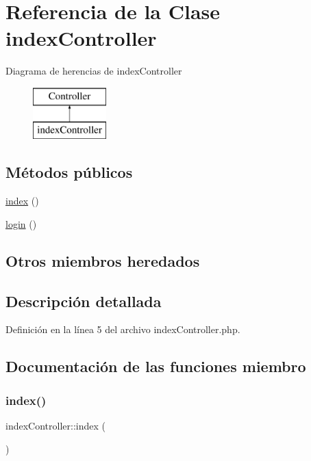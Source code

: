 \hypertarget{classindex_controller}{}\section{Referencia de la Clase index\+Controller}
\label{classindex_controller}
Diagrama de herencias de index\+Controller\begin{figure}[H]
\begin{center}
\leavevmode
\includegraphics[height=2.000000cm]{classindex_controller}
\end{center}
\end{figure}
\subsection*{Métodos públicos}
\begin{DoxyCompactItemize}
\item 
\mbox{\hyperlink{classindex_controller_a6fcef784f4db52a9201f33ae902719e5}{index}} ()
\item 
\mbox{\hyperlink{classindex_controller_ad14fd2e2267073c8d3e13eb6ff7f7379}{login}} ()
\end{DoxyCompactItemize}
\subsection*{Otros miembros heredados}


\subsection{Descripción detallada}


Definición en la línea 5 del archivo index\+Controller.\+php.



\subsection{Documentación de las funciones miembro}
\mbox{\label{classindex_controller_a6fcef784f4db52a9201f33ae902719e5}} 
\subsubsection{\texorpdfstring{index()}{index()}}
{\footnotesize\ttfamily index\+Controller\+::index (\begin{DoxyParamCaption}{ }\end{DoxyParamCaption})}

